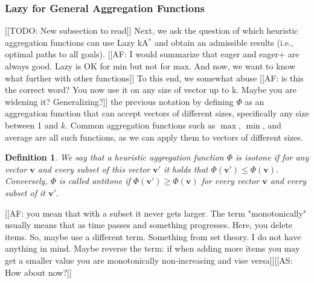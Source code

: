 \documentclass[twoside,11pt]{article}
\newtheorem{definition}[theorem]{Definition}
\newcommand{\kastar}{kA$^*$\xspace}
\newcommand{\vect}[1]{\mathbf{#1}}
\begin{document}


\subsubsection{Lazy for General Aggregation Functions}
[[TODO: New subsection to read]]
Next, we ask the question of which heuristic aggregation functions can use Lazy \kastar and obtain  an admissible results (i.e., optimal paths to all goals). [[AF: I would summarize that eager and eager+ are always good. Lazy is OK for min but not for max. And now, we want to know what further with other functions]]
To this end, we somewhat abuse [[AF: is this the correct word? You now use it on any size of vector up to k. Maybe you are widening it? Generalizing?]] the previous notation by defining $\Phi$ as an aggregation function that can accept vectors of different sizes,  specifically any size between 1 and $k$.
Common aggregation functions such as $\max$, $\min$, and average are all such functions, as we can apply them to vectors of different sizes. 

\begin{definition}
We say that a heuristic aggregation function $\Phi$ is \emph{isotone} if for any vector $\vect{v}$ and every subset of this vector $\vect{v'}$ it holds that $\Phi(\vect{v'})\leq \Phi(\vect{v})$.
Conversely, $\Phi$ is called \emph{antitone} if $\Phi(\vect{v'})\geq \Phi(\vect{v})$ for every vector $\vect{v}$ and every subset of it $\vect{v'}$.
\end{definition}

[[AF: you mean that with a subset it never gets larger. The term "monotonically" usually means that as time passes and something progresses. Here, you delete items. So, maybe use a different term. Something from set theory. I do not have anything in mind. Maybe reverse the term: if when adding more items you may get a smaller value you are monotonically non-increasing and vise versa]][[AS: How about now?]]
\end{document}
